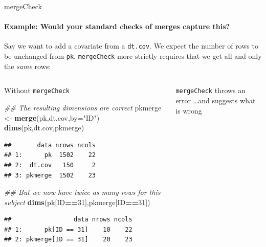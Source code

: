 \documentclass[
  8pt,
  ignorenonframetext,
  aspectratio=169]{beamer}
\newenvironment{Shaded}{\begin{snugshade}}{\end{snugshade}}
\newcommand{\CommentTok}[1]{\textcolor[rgb]{0.56,0.35,0.01}{\textit{#1}}}
\newcommand{\DataTypeTok}[1]{\textcolor[rgb]{0.13,0.29,0.53}{#1}}
\newcommand{\DecValTok}[1]{\textcolor[rgb]{0.00,0.00,0.81}{#1}}
\newcommand{\KeywordTok}[1]{\textcolor[rgb]{0.13,0.29,0.53}{\textbf{#1}}}
\newcommand{\NormalTok}[1]{#1}
\newcommand{\OperatorTok}[1]{\textcolor[rgb]{0.81,0.36,0.00}{\textbf{#1}}}
\newcommand{\StringTok}[1]{\textcolor[rgb]{0.31,0.60,0.02}{#1}}
\begin{document}
\begin{frame}[fragile]{mergeCheck}
\protect\hypertarget{mergecheck}{}
\framesubtitle{Example: Would your standard checks of merges capture this?}

Say we want to add a covariate from a \texttt{dt.cov}. We expect the
number of rows to be unchanged from \texttt{pk}. \texttt{mergeCheck}
more strictly requires that we get all and only the \emph{same} rows:

\begin{columns}[T]
\begin{column}{0.48\textwidth}
\begin{block}{Without \texttt{mergeCheck}}
\protect\hypertarget{without-mergecheck}{}
\footnotesize

\begin{Shaded}
\begin{Highlighting}[]
\CommentTok{\#\# The resulting dimensions are correct}
\NormalTok{pkmerge \textless{}{-}}\StringTok{ }\KeywordTok{merge}\NormalTok{(pk,dt.cov,}\DataTypeTok{by=}\StringTok{"ID"}\NormalTok{)}
\KeywordTok{dims}\NormalTok{(pk,dt.cov,pkmerge)}
\end{Highlighting}
\end{Shaded}

\begin{verbatim}
##       data nrows ncols
## 1:      pk  1502    22
## 2:  dt.cov   150     2
## 3: pkmerge  1502    23
\end{verbatim}

\begin{Shaded}
\begin{Highlighting}[]
\CommentTok{\#\# But we now have twice as many rows for this subject}
\KeywordTok{dims}\NormalTok{(pk[ID}\OperatorTok{==}\DecValTok{31}\NormalTok{],pkmerge[ID}\OperatorTok{==}\DecValTok{31}\NormalTok{])}
\end{Highlighting}
\end{Shaded}

\begin{verbatim}
##                 data nrows ncols
## 1:      pk[ID == 31]    10    22
## 2: pkmerge[ID == 31]    20    23
\end{verbatim}
\end{block}
\end{column}

\begin{column}{0.48\textwidth}
\begin{block}{\texttt{mergeCheck} throws an error}
\protect\hypertarget{mergecheck-throws-an-error}{}
\ldots and suggests what is wrong \footnotesize


\end{block}
\end{column}
\end{columns}
\end{frame}
\end{document}

